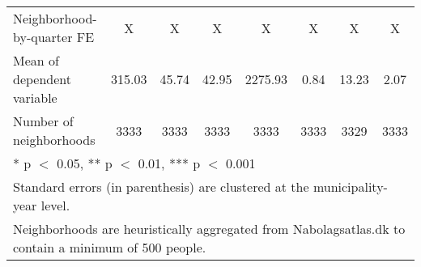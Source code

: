 \begin{tabular}[t]{lccccccc}
Neighborhood-by-quarter FE & X & X & X & X & X & X & X\\
Mean of dependent variable & 315.03 & 45.74 & 42.95 & 2275.93 & 0.84 & 13.23 & 2.07\\
Number of neighborhoods & 3333 & 3333 & 3333 & 3333 & 3333 & 3329 & 3333\\
\bottomrule
\multicolumn{8}{l}{\rule{0pt}{1em}* p $<$ 0.05, ** p $<$ 0.01, *** p $<$ 0.001}\\
\multicolumn{8}{l}{\rule{0pt}{1em}Standard errors (in parenthesis) are clustered at the municipality-year level.}\\
\multicolumn{8}{l}{\rule{0pt}{1em}Neighborhoods are heuristically aggregated from Nabolagsatlas.dk to contain a minimum of 500 people.}\\
\end{tabular}